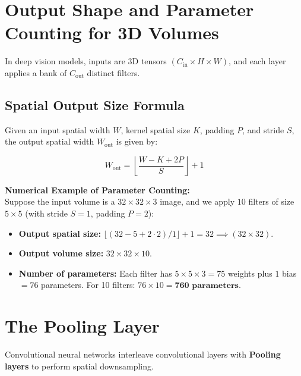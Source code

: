 \section{Output Shape and Parameter Counting for 3D Volumes}

In deep vision models, inputs are 3D tensors $(C_{\text{in}} \times H \times W)$, and each layer applies a bank of $C_{\text{out}}$ distinct filters.

\subsection{Spatial Output Size Formula}
Given an input spatial width $W$, kernel spatial size $K$, padding $P$, and stride $S$, the output spatial width $W_{\text{out}}$ is given by:

\begin{equation}
W_{\text{out}} = \left\lfloor \frac{W - K + 2P}{S} \right\rfloor + 1
\label{eq:spatial_output_size}
\end{equation}

\begin{examplebox}
\textbf{Numerical Example of Parameter Counting:}\\
Suppose the input volume is a $32 \times 32 \times 3$ image, and we apply $10$ filters of size $5 \times 5$ (with stride $S = 1$, padding $P = 2$):
\begin{itemize}[nosep, leftmargin=*]
    \item \textbf{Output spatial size:} $\lfloor(32 - 5 + 2 \cdot 2)/1\rfloor + 1 = 32 \implies (32 \times 32)$.
    \item \textbf{Output volume size:} $32 \times 32 \times 10$.
    \item \textbf{Number of parameters:} Each filter has $5 \times 5 \times 3 = 75$ weights plus $1$ bias $= 76$ parameters. For 10 filters: $76 \times 10 = \mathbf{760\text{ parameters}}$.
\end{itemize}
\end{examplebox}



\section{The Pooling Layer}

Convolutional neural networks interleave convolutional layers with \textbf{Pooling layers} to perform spatial downsampling.

